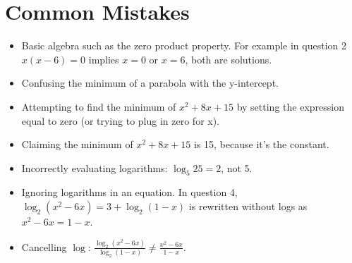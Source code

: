 \documentclass[a4paper, 12pt]{article}
\begin{document}
\newpage

\section*{Common Mistakes}

\begin{itemize}
    \item Basic algebra such as the zero product property. For example in question 2$x(x-6) = 0$ implies $x=0$ or $x=6$, both are solutions.
    \item Confusing the minimum of a parabola with the y-intercept. 
    \item Attempting to find the minimum of $x^2 + 8x + 15$ by setting the expression equal to zero (or trying to plug in zero for x).
    \item Claiming the minimum of $x^2 + 8x +15 $ is 15, because it's the constant.
    \item Incorrectly evaluating logarithms: $\log_5 25 = 2$, not 5.
    \item Ignoring logarithms in an equation. In question 4,  $\log_2 (x^2 -6x) = 3 + \log_2(1-x)$ is rewritten without logs as $x^2 - 6x = 1-x$.
    \item Cancelling $\log$: 
    $\frac{\log_2 (x^2 - 6x) }{\log_2 ( 1-x) } \neq \frac{x^2 - 6x }{1-x}$.
\end{itemize}
\end{document}
